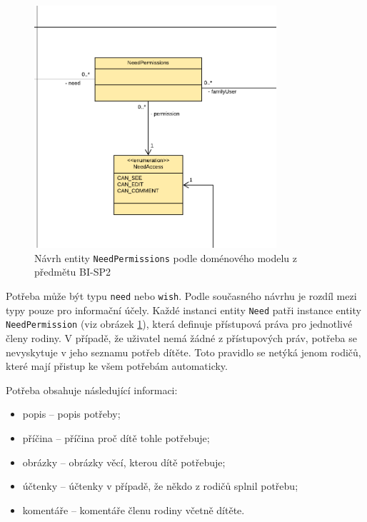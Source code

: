         \begin{figure}\centering
	        \includegraphics[width=0.8\textwidth]{pdfs/NeedPermissions1}
	        \caption[Návrh entity \texttt{NeedPermissions}]{Návrh entity \texttt{NeedPermissions} podle doménového modelu z předmětu BI-SP2}\label{image:NeedPermissions1}
        \end{figure}
        Potřeba může být typu \verb|need| nebo \verb|wish|. Podle současného návrhu je rozdíl mezi typy pouze pro informační účely. Každé instanci entity \verb|Need| patři instance entity \verb|NeedPermission| (viz obrázek \ref{image:NeedPermissions1}), která definuje přístupová práva pro jednotlivé členy rodiny. V případě, že uživatel nemá žádné z přístupových práv, potřeba se nevyskytuje v jeho seznamu potřeb dítěte. Toto pravidlo se netýká jenom rodičů, které mají přistup ke všem potřebám automaticky.
       
       Potřeba obsahuje následující informaci:
        \begin{itemize}
            \item popis -- popis potřeby;
            \item příčina -- příčina proč dítě tohle potřebuje;
            \item obrázky -- obrázky věcí, kterou dítě potřebuje;
            \item účtenky -- účtenky v případě, že někdo z rodičů splnil potřebu;
            \item komentáře -- komentáře členu rodiny včetně dítěte.
        \end{itemize}
    
